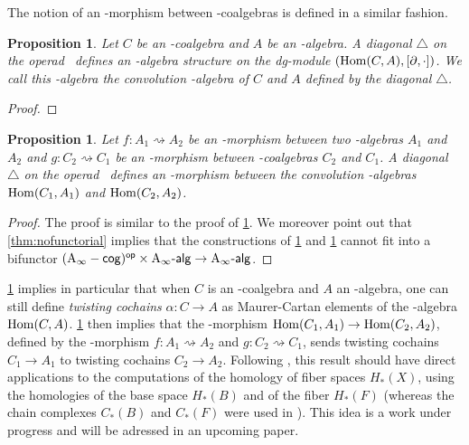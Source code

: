 \documentclass[twoside, 12pt]{amsart}
\newtheorem{proposition}[definition]{Proposition}
\theoremstyle{remark}
\begin{document}
\noindent The notion of an \Ainf -morphism between \Ainf -coalgebras is defined in a similar fashion.

\begin{proposition} \label{prop:convolution-ainf}
Let $C$ be an \Ainf -coalgebra and $A$ be an \Ainf -algebra. A diagonal $\triangle$ on the operad \Ainf\ defines an \Ainf -algebra structure on the dg-module $(\mathrm{Hom} (C,A) , [ \partial , \cdot ])$. We call this \Ainf -algebra the \emph{convolution \Ainf -algebra of $C$ and $A$} defined by the diagonal $\triangle$.
\end{proposition}

\begin{proof} 
\end{proof}

\begin{proposition} \label{prop:convolution-minf}
Let $f : A_1 \rightsquigarrow A_2$ be an \Ainf -morphism between two \Ainf -algebras $A_1$ and $A_2$ and $g : C_2 \rightsquigarrow C_1$ be an \Ainf -morphism between \Ainf -coalgebras $C_2$ and $C_1$. A diagonal $\triangle$ on the operad \Minf\ defines an \Ainf -morphism between the convolution \Ainf -algebras $\mathrm{Hom} (C_1,A_1)$ and $\mathrm{Hom} (C_2,A_2)$. 
\end{proposition}

\begin{proof}
The proof is similar to the proof of \cref{prop:convolution-ainf}. We moreover point out that \cref{thm:nofunctorial} implies that the constructions of \cref{prop:convolution-ainf} and \cref{prop:convolution-minf} cannot fit into a bifunctor $\mathsf{(\mathrm{A}_\infty -cog)^{op}} \times \mathrm{A}_\infty\text{-}\mathsf{alg} \rightarrow \mathrm{A}_\infty\text{-}\mathsf{alg}$.
\end{proof}

\cref{prop:convolution-ainf} implies in particular that when $C$ is an \Ainf -coalgebra and $A$ an \Ainf -algebra, one can still define \textit{twisting cochains} $\alpha : C \rightarrow A$ as Maurer-Cartan elements of the \Ainf -algebra $\mathrm{Hom} (C,A)$. 
\cref{prop:convolution-minf} then implies that the \Ainf -morphism $\mathrm{Hom} (C_1,A_1) \rightarrow \mathrm{Hom} (C_2,A_2)$, defined by the \Ainf -morphism $f : A_1 \rightsquigarrow A_2$ and $g : C_2 \rightsquigarrow C_1$, sends twisting cochains $C_1 \rightarrow A_1$ to twisting cochains $C_2 \rightarrow A_2$.
Following \cite[Section 5.5]{Proute86}, this result should have direct applications to the computations of the homology of fiber spaces $H_*(X)$, using the homologies of the base space $H_*(B)$ and of the fiber $H_*(F)$ (whereas the chain complexes $C_*(B)$ and $C_*(F)$ were used in \cite{Brown59}). This idea is a work under progress and will be adressed in an upcoming paper.
\end{document}
